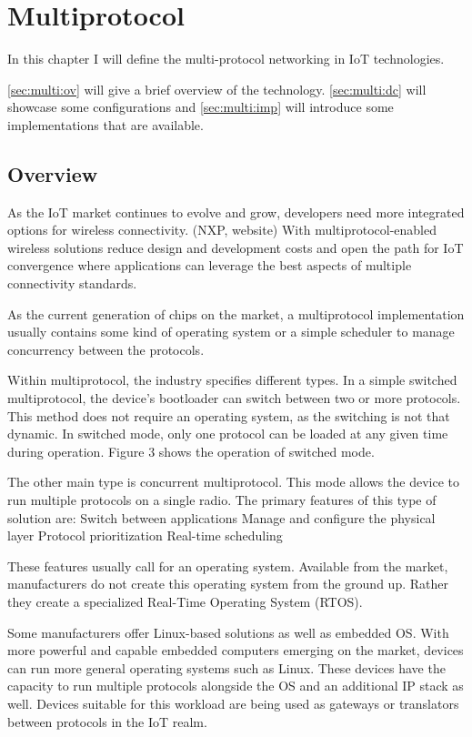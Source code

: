 \chapter{Multiprotocol}
\label{chap:multiprot}
In this chapter I will define the multi-protocol networking in IoT technologies.

\autoref{sec:multi:ov} will give a brief overview of the technology.
\autoref{sec:multi:dc} will showcase some configurations and \autoref{sec:multi:imp} will introduce some implementations that are available.

\section{Overview}
\label{sec:multi:ov}
As the IoT market continues to evolve and grow, developers need more integrated options for wireless connectivity. (NXP, website) With multiprotocol-enabled wireless solutions reduce design and development costs and open the path for IoT convergence where applications can leverage the best aspects of multiple connectivity standards.

As the current generation of chips on the market, a multiprotocol implementation usually contains some kind of operating system or a simple scheduler to manage concurrency between the protocols.

Within multiprotocol, the industry specifies different types. In a simple switched multiprotocol, the device's bootloader can switch between two or more protocols. This method does not require an operating system, as the switching is not that dynamic. In switched mode, only one protocol can be loaded at any given time during operation. Figure 3 shows the operation of switched mode.

The other main type is concurrent multiprotocol. This mode allows the device to run multiple protocols on a single radio. The primary features of this type of solution are:
Switch between applications
Manage and configure the physical layer
Protocol prioritization
Real-time scheduling

These features usually call for an operating system. Available from the market, manufacturers do not create this operating system from the ground up. Rather they create a specialized Real-Time Operating System (RTOS).

Some manufacturers offer Linux-based solutions as well as embedded OS. With more powerful and capable embedded computers emerging on the market, devices can run more general operating systems such as Linux. These devices have the capacity to run multiple protocols alongside the OS and an additional IP stack as well. Devices suitable for this workload are being used as gateways or translators between protocols in the IoT realm.

